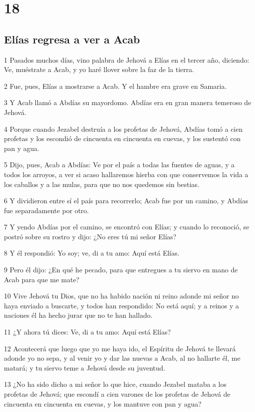 \chapter{18}

\section*{Elías regresa a ver a Acab}

\par 1 Pasados muchos días, vino palabra de Jehová a Elías en el tercer año, diciendo: Ve, muéstrate a Acab, y yo haré llover sobre la faz de la tierra.
\par 2 Fue, pues, Elías a mostrarse a Acab. Y el hambre era grave en Samaria.
\par 3 Y Acab llamó a Abdías su mayordomo. Abdías era en gran manera temeroso de Jehová.
\par 4 Porque cuando Jezabel destruía a los profetas de Jehová, Abdías tomó a cien profetas y los escondió de cincuenta en cincuenta en cuevas, y los sustentó con pan y agua.
\par 5 Dijo, pues, Acab a Abdías: Ve por el país a todas las fuentes de aguas, y a todos los arroyos, a ver si acaso hallaremos hierba con que conservemos la vida a los caballos y a las mulas, para que no nos quedemos sin bestias.
\par 6 Y dividieron entre sí el país para recorrerlo; Acab fue por un camino, y Abdías fue separadamente por otro.
\par 7 Y yendo Abdías por el camino, se encontró con Elías; y cuando lo reconoció, se postró sobre su rostro y dijo: ¿No eres tú mi señor Elías?
\par 8 Y él respondió: Yo soy; ve, di a tu amo: Aquí está Elías.
\par 9 Pero él dijo: ¿En qué he pecado, para que entregues a tu siervo en mano de Acab para que me mate?
\par 10 Vive Jehová tu Dios, que no ha habido nación ni reino adonde mi señor no haya enviado a buscarte, y todos han respondido: No está aquí; y a reinos y a naciones él ha hecho jurar que no te han hallado.
\par 11 ¿Y ahora tú dices: Ve, di a tu amo: Aquí está Elías?
\par 12 Acontecerá que luego que yo me haya ido, el Espíritu de Jehová te llevará adonde yo no sepa, y al venir yo y dar las nuevas a Acab, al no hallarte él, me matará; y tu siervo teme a Jehová desde su juventud.
\par 13 ¿No ha sido dicho a mi señor lo que hice, cuando Jezabel mataba a los profetas de Jehová; que escondí a cien varones de los profetas de Jehová de cincuenta en cincuenta en cuevas, y los mantuve con pan y agua?
